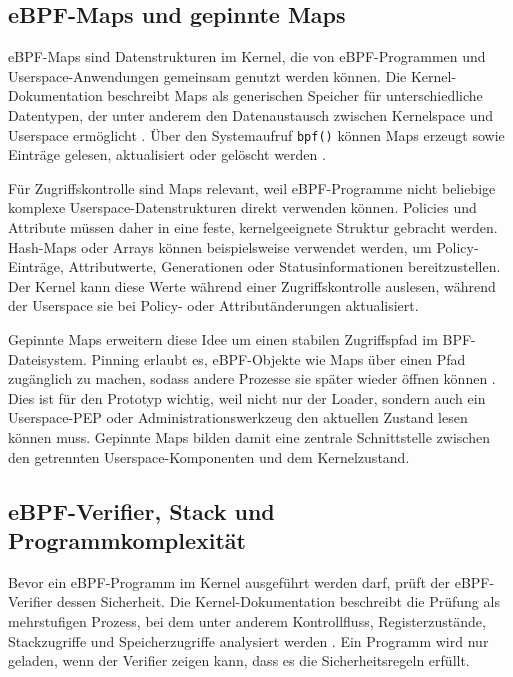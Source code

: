 \subsection{eBPF-Maps und gepinnte Maps}
eBPF-Maps sind Datenstrukturen im Kernel, die von eBPF-Programmen und Userspace-Anwendungen gemeinsam genutzt werden können. 
Die Kernel-Dokumentation beschreibt Maps als generischen Speicher für unterschiedliche Datentypen, der unter anderem den Datenaustausch zwischen Kernelspace und Userspace ermöglicht \citep{kernelBpfMaps,manBpf}.
Über den Systemaufruf \texttt{bpf()} können Maps erzeugt sowie Einträge gelesen, aktualisiert oder gelöscht werden \citep{manBpf}.

Für Zugriffskontrolle sind Maps relevant, weil eBPF-Programme nicht beliebige komplexe Userspace-Datenstrukturen direkt verwenden können. 
Policies und Attribute müssen daher in eine feste, kernelgeeignete Struktur gebracht werden. 
Hash-Maps oder Arrays können beispielsweise verwendet werden, um Policy-Einträge, Attributwerte, Generationen oder Statusinformationen bereitzustellen. 
Der Kernel kann diese Werte während einer Zugriffskontrolle auslesen, während der Userspace sie bei Policy- oder Attributänderungen aktualisiert.

Gepinnte Maps erweitern diese Idee um einen stabilen Zugriffspfad im BPF-Dateisystem. 
Pinning erlaubt es, eBPF-Objekte wie Maps über einen Pfad zugänglich zu machen, sodass andere Prozesse sie später wieder öffnen können \citep{ebpfPinning}. 
Dies ist für den Prototyp wichtig, weil nicht nur der Loader, sondern auch ein Userspace-PEP oder Administrationswerkzeug den aktuellen Zustand lesen können muss.
Gepinnte Maps bilden damit eine zentrale Schnittstelle zwischen den getrennten Userspace-Komponenten und dem Kernelzustand.

\subsection{eBPF-Verifier, Stack und Programmkomplexität}\label{sec:ebpf-verifier}
Bevor ein eBPF-Programm im Kernel ausgeführt werden darf, prüft der eBPF-Verifier dessen Sicherheit. 
Die Kernel-Dokumentation beschreibt die Prüfung als mehrstufigen Prozess, bei dem unter anderem Kontrollfluss, Registerzustände, Stackzugriffe und Speicherzugriffe analysiert werden \citep{kernelBpfVerifier}. 
Ein Programm wird nur geladen, wenn der Verifier zeigen kann, dass es die Sicherheitsregeln erfüllt.

